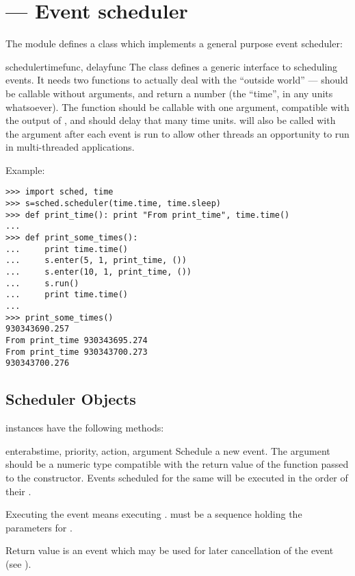 \section{ ---
         Event scheduler}



The  module defines a class which implements a general
purpose event scheduler:

\begin{classdesc}{scheduler}{timefunc, delayfunc}
The  class defines a generic interface to scheduling
events. It needs two functions to actually deal with the ``outside world''
---  should be callable without arguments, and return 
a number (the ``time'', in any units whatsoever).  The 
function should be callable with one argument, compatible with the output
of , and should delay that many time units.
 will also be called with the argument  after
each event is run to allow other threads an opportunity to run in
multi-threaded applications.
\end{classdesc}

Example:

\begin{verbatim}
>>> import sched, time
>>> s=sched.scheduler(time.time, time.sleep)
>>> def print_time(): print "From print_time", time.time()
...
>>> def print_some_times():
...     print time.time()
...     s.enter(5, 1, print_time, ())
...     s.enter(10, 1, print_time, ())
...     s.run()
...     print time.time()
...
>>> print_some_times()
930343690.257
From print_time 930343695.274
From print_time 930343700.273
930343700.276
\end{verbatim}


\subsection{Scheduler Objects \label{scheduler-objects}}

 instances have the following methods:

\begin{methoddesc}{enterabs}{time, priority, action, argument}
Schedule a new event. The  argument should be a numeric type
compatible with the return value of the  function passed 
to the constructor. Events scheduled for
the same  will be executed in the order of their
.

Executing the event means executing
.   must be a
sequence holding the parameters for .

Return value is an event which may be used for later cancellation of
the event (see ).
\end{methoddesc}

